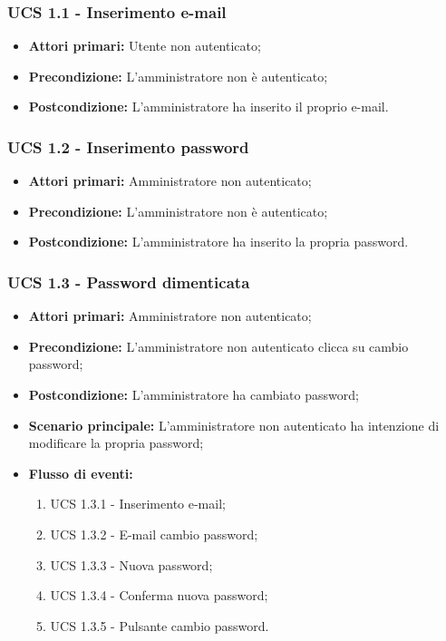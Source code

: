 \subsubsection{UCS 1.1 - Inserimento e-mail}%
\begin{itemize}
\item \textbf{Attori primari:} Utente non autenticato;
\item \textbf{Precondizione:} L'amministratore non è autenticato;
\item \textbf{Postcondizione:} L'amministratore ha inserito il proprio e-mail.
\end{itemize}

\subsubsection{UCS 1.2 - Inserimento password}%
\begin{itemize}
\item \textbf{Attori primari:} Amministratore non autenticato;
\item \textbf{Precondizione:} L'amministratore non è autenticato;
\item \textbf{Postcondizione:} L'amministratore ha inserito la propria password.
\end{itemize}

\subsubsection{UCS 1.3 - Password dimenticata}%
\begin{itemize}
\item \textbf{Attori primari:} Amministratore non autenticato;
\item \textbf{Precondizione:}  L'amministratore non autenticato clicca su cambio password;
\item \textbf{Postcondizione:} L'amministratore ha cambiato password;
\item \textbf{Scenario principale:} L'amministratore non autenticato ha intenzione di modificare la propria password;
\item \textbf{Flusso di eventi:}
    \begin{enumerate}
        \item UCS 1.3.1 - Inserimento e-mail;
        \item UCS 1.3.2 - E-mail cambio password;
        \item UCS 1.3.3 - Nuova password;
        \item UCS 1.3.4 - Conferma nuova password;
        \item UCS 1.3.5 - Pulsante cambio password.
    \end{enumerate}
\end{itemize}

